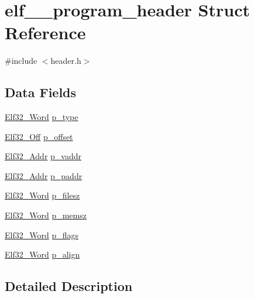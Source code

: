 \hypertarget{structelf__32__program__header}{
\section{elf\_\_\-program\_\-header Struct Reference}
\label{structelf__32__program__header}
}


{\ttfamily \#include $<$header.h$>$}

\subsection*{Data Fields}
\begin{DoxyCompactItemize}
\item 
\hyperlink{header_8h_aaf2adb6079d594afee7de40cee594c34}{Elf32\_\-Word} \hyperlink{structelf__32__program__header_af220a98c5b7f9968195246e76afc2c86}{p\_\-type}
\item 
\hyperlink{header_8h_aa29786fd537fb0970d39bb3b9ed48e96}{Elf32\_\-Off} \hyperlink{structelf__32__program__header_aa3e8460560d072a37656cf4fdf4839f6}{p\_\-offset}
\item 
\hyperlink{header_8h_a6041cee195469c34b94c8605b53a98f9}{Elf32\_\-Addr} \hyperlink{structelf__32__program__header_ab11f74e50c7ef5781fceeb94d729d423}{p\_\-vaddr}
\item 
\hyperlink{header_8h_a6041cee195469c34b94c8605b53a98f9}{Elf32\_\-Addr} \hyperlink{structelf__32__program__header_ac29cb8df1e8341ad6184020d374718b3}{p\_\-paddr}
\item 
\hyperlink{header_8h_aaf2adb6079d594afee7de40cee594c34}{Elf32\_\-Word} \hyperlink{structelf__32__program__header_adea383271339e61d6dc701a292fd6596}{p\_\-filesz}
\item 
\hyperlink{header_8h_aaf2adb6079d594afee7de40cee594c34}{Elf32\_\-Word} \hyperlink{structelf__32__program__header_a9b8d565ea2d52584f038a437a7c714c7}{p\_\-memsz}
\item 
\hyperlink{header_8h_aaf2adb6079d594afee7de40cee594c34}{Elf32\_\-Word} \hyperlink{structelf__32__program__header_a98c788bfdf95178f0e590c086002eaf9}{p\_\-flags}
\item 
\hyperlink{header_8h_aaf2adb6079d594afee7de40cee594c34}{Elf32\_\-Word} \hyperlink{structelf__32__program__header_a2a8ee61f9995f7be7f3fedf4b7ba12c6}{p\_\-align}
\end{DoxyCompactItemize}


\subsection{Detailed Description}


